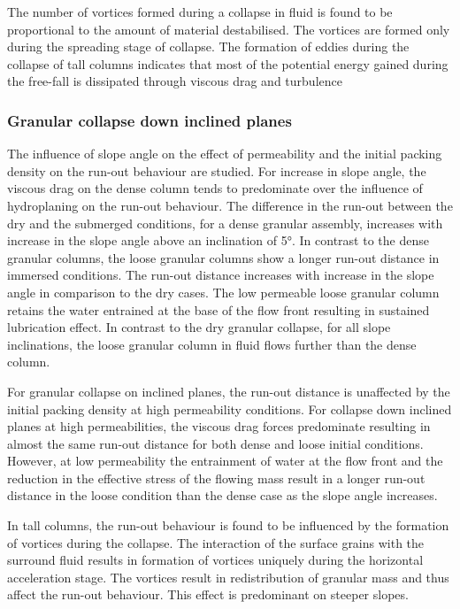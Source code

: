 The number of vortices formed during a collapse in fluid is found to be 
proportional to the amount of material destabilised. The vortices are formed 
only during the spreading stage of collapse. The formation of eddies during the 
collapse of tall columns indicates that most of the potential energy gained 
during the free-fall is dissipated through viscous drag and turbulence


\subsubsection*{Granular collapse down inclined planes}

The influence of slope angle on the effect of permeability and the initial 
packing density on the run-out behaviour are studied. For increase in slope 
angle, the viscous drag on the dense column tends to predominate over the 
influence of hydroplaning on the run-out behaviour. The difference in the 
run-out between the dry and the submerged conditions, for a dense granular 
assembly, increases with increase in the slope angle above an inclination of 
5\si{\degree}. In contrast to the dense granular columns, the loose granular 
columns show a longer run-out distance in immersed conditions. The run-out 
distance increases with increase in the slope angle in comparison to the dry 
cases. The low permeable loose granular column retains the water entrained at 
the base of the flow front resulting in sustained lubrication effect. In 
contrast to the dry granular collapse, for all slope inclinations, the loose 
granular column in fluid flows further than the dense column. 

For granular collapse on inclined planes, the run-out distance is unaffected by 
the initial packing density at high permeability conditions. For collapse down 
inclined planes at high permeabilities, the viscous drag forces predominate 
resulting in almost the same run-out distance for both dense and loose initial 
conditions. However, at low permeability the entrainment of water at the flow 
front and the reduction in the effective stress of the flowing mass result in a 
longer run-out distance in the loose condition than the dense case as the slope 
angle increases.

In tall columns, the run-out behaviour is found to be influenced by the 
formation of vortices during the collapse. The interaction of the surface 
grains with the surround fluid results in formation of vortices uniquely during 
the horizontal acceleration stage. The vortices result in redistribution of 
granular mass and thus affect the run-out behaviour. This effect is 
predominant on steeper slopes. 

